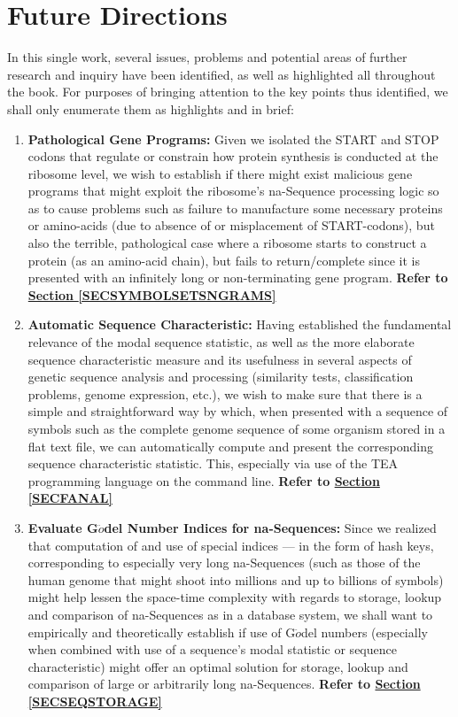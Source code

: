 \documentclass[a4paper, 18pt]{book} %
\begin{document}
\section{Future Directions}
\label{SECFUTUREDIRECT}

In this single work, several issues, problems and potential areas of further research and inquiry have been identified, as well as highlighted all throughout the book. For purposes of bringing attention to the key points thus identified, we shall only enumerate them as highlights and in brief:

\begin{enumerate}
\item \textbf{Pathological Gene Programs:} Given we isolated the START and STOP codons that regulate or constrain how protein synthesis is conducted at the ribosome level, we wish to establish if there might exist malicious gene programs that might exploit the ribosome's na-Sequence processing logic so as to cause problems such as failure to manufacture some necessary proteins or amino-acids (due to absence of or misplacement of START-codons), but also the terrible, pathological case where a ribosome starts to construct a protein (as an amino-acid chain), but fails to return/complete since it is presented with an infinitely long or non-terminating gene program. \textbf{Refer to \textbf{\hyperref[SECSYMBOLSETSNGRAMS]{Section \ref{SECSYMBOLSETSNGRAMS}}}}

\item \textbf{Automatic Sequence Characteristic:} Having established the fundamental relevance of the modal sequence statistic, as well as the more elaborate sequence characteristic measure and its usefulness in several aspects of genetic sequence analysis and processing (similarity tests, classification problems, genome expression, etc.), we wish to make sure that there is a simple and straightforward way by which, when presented with a sequence of symbols such as the complete genome sequence of some organism stored in a flat text file, we can automatically compute and present the corresponding sequence characteristic statistic. This, especially via use of the TEA programming language on the command line. \textbf{Refer to \textbf{\hyperref[SECFANAL]{Section \ref{SECFANAL}}}}

\item \textbf{Evaluate G$\ddot{o}$del Number Indices for na-Sequences:} Since we realized that computation of and use of special indices --- in the form of hash keys, corresponding to especially very long na-Sequences (such as those of the human genome that might shoot into millions and up to billions of symbols) might help lessen the space-time complexity with regards to storage, lookup and comparison of na-Sequences as in a database system, we shall want to empirically and theoretically establish if use of G$\ddot{o}$del numbers (especially when combined with use of a sequence's modal statistic or sequence characteristic) might offer an optimal solution for storage, lookup and comparison of large or arbitrarily long na-Sequences. \textbf{Refer to \textbf{\hyperref[SECSEQSTORAGE]{Section \ref{SECSEQSTORAGE}}}}


\end{enumerate}
\end{document}
